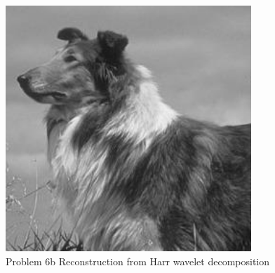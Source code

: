 \documentclass{article}
\begin{document}
\begin{figure}[!h]
  \centering
    \includegraphics[height=25em]{code/outputs/prob6b.jpg}
  \caption{Problem 6b Reconstruction from Harr wavelet decomposition}
  \label{fig:output6b0}
\end{figure}
\end{document}
